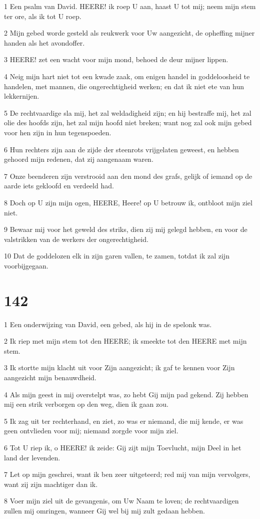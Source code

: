 \par 1 Een psalm van David. HEERE! ik roep U aan, haast U tot mij; neem mijn stem ter ore, als ik tot U roep.
\par 2 Mijn gebed worde gesteld als reukwerk voor Uw aangezicht, de opheffing mijner handen als het avondoffer.
\par 3 HEERE! zet een wacht voor mijn mond, behoed de deur mijner lippen.
\par 4 Neig mijn hart niet tot een kwade zaak, om enigen handel in goddeloosheid te handelen, met mannen, die ongerechtigheid werken; en dat ik niet ete van hun lekkernijen.
\par 5 De rechtvaardige sla mij, het zal weldadigheid zijn; en hij bestraffe mij, het zal olie des hoofds zijn, het zal mijn hoofd niet breken; want nog zal ook mijn gebed voor hen zijn in hun tegenspoeden.
\par 6 Hun rechters zijn aan de zijde der steenrots vrijgelaten geweest, en hebben gehoord mijn redenen, dat zij aangenaam waren.
\par 7 Onze beenderen zijn verstrooid aan den mond des grafs, gelijk of iemand op de aarde iets gekloofd en verdeeld had.
\par 8 Doch op U zijn mijn ogen, HEERE, Heere! op U betrouw ik, ontbloot mijn ziel niet.
\par 9 Bewaar mij voor het geweld des striks, dien zij mij gelegd hebben, en voor de valstrikken van de werkers der ongerechtigheid.
\par 10 Dat de goddelozen elk in zijn garen vallen, te zamen, totdat ik zal zijn voorbijgegaan.

\chapter{142}

\par 1 Een onderwijzing van David, een gebed, als hij in de spelonk was.
\par 2 Ik riep met mijn stem tot den HEERE; ik smeekte tot den HEERE met mijn stem.
\par 3 Ik stortte mijn klacht uit voor Zijn aangezicht; ik gaf te kennen voor Zijn aangezicht mijn benauwdheid.
\par 4 Als mijn geest in mij overstelpt was, zo hebt Gij mijn pad gekend. Zij hebben mij een strik verborgen op den weg, dien ik gaan zou.
\par 5 Ik zag uit ter rechterhand, en ziet, zo was er niemand, die mij kende, er was geen ontvlieden voor mij; niemand zorgde voor mijn ziel.
\par 6 Tot U riep ik, o HEERE! ik zeide: Gij zijt mijn Toevlucht, mijn Deel in het land der levenden.
\par 7 Let op mijn geschrei, want ik ben zeer uitgeteerd; red mij van mijn vervolgers, want zij zijn machtiger dan ik.
\par 8 Voer mijn ziel uit de gevangenis, om Uw Naam te loven; de rechtvaardigen zullen mij omringen, wanneer Gij wel bij mij zult gedaan hebben.

